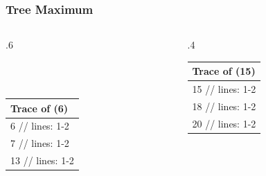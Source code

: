\documentclass[10pt]{beamer}
\begin{document}
\begin{frame}[t]\frametitle{Tree Maximum}
	\begin{columns}[T] %
	\begin{column}{.6\linewidth} %
		{\footnotesize
				
		} %

		\vspace{1.5cm}	
		{\footnotesize 
			\\
			\\
		} %
		

		\vspace{1cm}	
		{\footnotesize 
			\begin{tabular}{| l |}
			\hline
			Trace of {\scriptsize \TreeMaximum(6)}\\
			\hline
			6 // lines: 1-2\\
			7 // lines: 1-2\\
			13 // lines: 1-2\\
			\hline
			\end{tabular}
		} %

	\end{column} %
	\begin{column}{.4\linewidth} %

		{\small 
		
		} %
	
		\vspace{0.5cm}	
		{\footnotesize 
			\begin{tabular}{| l |}
			\hline
			Trace of {\scriptsize \TreeMaximum(15)}\\
			\hline
			15 // lines: 1-2\\
			18 // lines: 1-2\\
			20 // lines: 1-2\\
			\hline
			\end{tabular}
		} %

	\end{column} %
	\end{columns} %
	
\end{frame}




\end{document}
